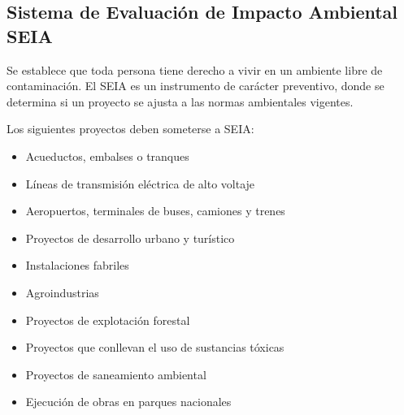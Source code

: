 \documentclass{article} %
\begin{document}
\subsection{Sistema de Evaluación de Impacto Ambiental SEIA}

Se establece que toda persona tiene derecho a vivir en un ambiente libre de contaminación. El SEIA es un instrumento de carácter preventivo, donde se determina si un proyecto se ajusta a las normas ambientales vigentes.

Los siguientes proyectos deben someterse a SEIA:

\begin{itemize}[label={},left=0pt,align=parleft]
    \item \begin{highlightbox}[levelone] Acueductos, embalses o tranques \end{highlightbox}
    \item \begin{highlightbox}[levelone] Líneas de transmisión eléctrica de alto voltaje \end{highlightbox}
    \item \begin{highlightbox}[levelone] Aeropuertos, terminales de buses, camiones y trenes \end{highlightbox}
    \item \begin{highlightbox}[levelone] Proyectos de desarrollo urbano y turístico \end{highlightbox}
    \item \begin{highlightbox}[levelone] Instalaciones fabriles \end{highlightbox}
    \item \begin{highlightbox}[levelone] Agroindustrias \end{highlightbox}
    \item \begin{highlightbox}[levelone] Proyectos de explotación forestal \end{highlightbox}
    \item \begin{highlightbox}[levelone] Proyectos que conllevan el uso de sustancias tóxicas \end{highlightbox}
    \item \begin{highlightbox}[levelone] Proyectos de saneamiento ambiental \end{highlightbox}
    \item \begin{highlightbox}[levelone] Ejecución de obras en parques nacionales \end{highlightbox}
\end{itemize}
\end{document}
